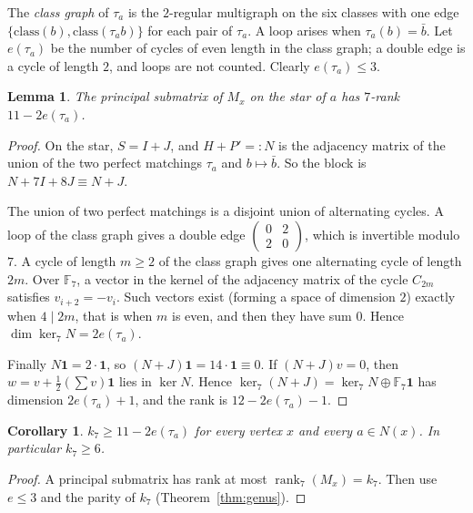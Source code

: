 \documentclass[11pt]{amsart}
\newtheorem{lemma}[theorem]{Lemma}
\newtheorem{corollary}[theorem]{Corollary}
\theoremstyle{remark}
\newcommand{\F}{\mathbb{F}}
\DeclareMathOperator{\rk}{rank}
\begin{document}
The \emph{class graph} of $\tau_a$ is the $2$-regular multigraph on the six classes with one edge
$\{\mathrm{class}(b),\mathrm{class}(\tau_a b)\}$ for each pair of $\tau_a$. A loop arises when $\tau_a(b)=\bar b$. Let
$e(\tau_a)$ be the number of cycles of even length in the class graph; a double edge is a cycle of length $2$, and loops
are not counted. Clearly $e(\tau_a)\le3$.

\begin{lemma}\label{lem:star}
The principal submatrix of $M_x$ on the star of $a$ has $7$-rank $11-2e(\tau_a)$.
\end{lemma}
\begin{proof}
On the star, $S=I+J$, and $H+P'=:N$ is the adjacency matrix of the union of the two perfect matchings $\tau_a$ and
$b\mapsto\bar b$. So the block is $N+7I+8J\equiv N+J$.

The union of two perfect matchings is a disjoint union of alternating cycles. A loop of the class graph gives a double
edge $\left(\begin{smallmatrix}0&2\\2&0\end{smallmatrix}\right)$, which is invertible modulo $7$. A cycle of length $m\ge2$
of the class graph gives one alternating cycle of length $2m$. Over $\F_7$, a vector in the kernel of the adjacency matrix
of the cycle $C_{2m}$ satisfies $v_{i+2}=-v_i$. Such vectors exist (forming a space of dimension $2$) exactly when
$4\mid 2m$, that is when $m$ is even, and then they have sum $0$. Hence $\dim\ker_7N=2e(\tau_a)$.

Finally $N\mathbf 1=2\cdot\mathbf 1$, so $(N+J)\mathbf 1=14\cdot\mathbf 1\equiv0$. If $(N+J)v=0$, then
$w=v+\tfrac12(\sum v)\mathbf 1$ lies in $\ker N$. Hence $\ker_7(N+J)=\ker_7N\oplus\F_7\mathbf 1$ has dimension
$2e(\tau_a)+1$, and the rank is $12-2e(\tau_a)-1$.
\end{proof}

\begin{corollary}\label{cor:6}
$k_7\ge 11-2e(\tau_a)$ for every vertex $x$ and every $a\in N(x)$. In particular $k_7\ge6$.
\end{corollary}
\begin{proof}
A principal submatrix has rank at most $\rk_7(M_x)=k_7$. Then use $e\le3$ and the parity of $k_7$
(Theorem~\ref{thm:genus}).
\end{proof}
\end{document}
